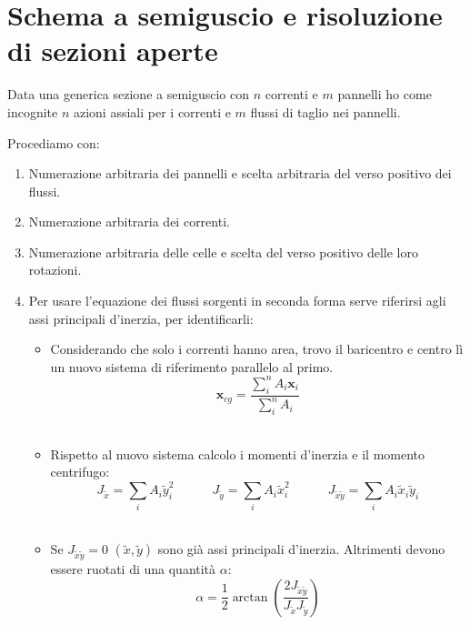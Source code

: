 \section{Schema a semiguscio e risoluzione di sezioni aperte}

Data una generica sezione a semiguscio con $n$ correnti e $m $ pannelli ho come incognite $n$ azioni assiali per i correnti e $m$ flussi di taglio nei pannelli.

Procediamo con:
\begin{enumerate}
    \item Numerazione arbitraria dei pannelli e scelta arbitraria del verso positivo dei flussi.\\
    \item Numerazione arbitraria dei correnti.\\
    \item Numerazione arbitraria delle celle e scelta del verso positivo delle loro rotazioni.\\
    \item Per usare l'equazione dei flussi sorgenti in seconda forma serve riferirsi agli assi principali d'inerzia, per identificarli:
    \begin{itemize}
        \item Considerando che solo i correnti hanno area, trovo il baricentro e centro lì un nuovo sistema di riferimento parallelo al primo.
            \begin{equation*}
                \boldsymbol{x}_{cg}=\frac{\sum_i^nA_i\boldsymbol{x}_i}{\sum_i^nA_i}
            \end{equation*}\\
        \item Rispetto al nuovo sistema calcolo i momenti d'inerzia e il momento centrifugo:
    \begin{equation*}
     J_{\tilde{x}} = \sum_i A_i \tilde{y}_i^2 \quad\quad\quad
     J_{\tilde{y}} = \sum_i A_i \tilde{x}_i^2 \quad\quad\quad
     J_{\tilde{x}\tilde{y}} = \sum_i A_i \tilde{x}_i \tilde{y}_i
    \end{equation*}\\
    \item Se $ J_{\tilde{x}\tilde{y}} = 0$ $(\tilde{x},\tilde{y})$ sono già assi principali d'inerzia. Altrimenti devono essere ruotati di una quantità $\alpha$:
    \begin{equation*}
        \alpha = \frac{1}{2} \arctan\left(\frac{2 J_{\tilde{x}\tilde{y}} }{J_{\tilde{x}} J_{\tilde{y}} }\right)
    \end{equation*}\\

\end{itemize}
\end{enumerate}
